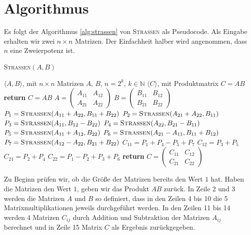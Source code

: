 \documentclass{scrartcl}
\numberwithin{equation}{section}
\begin{document}
\section{Algorithmus}
Es folgt der Algorithmus \ref{alg:strassen} von \textsc{Strassen}  als Pseudocode. Als Eingabe erhalten wir zwei $n \times n$ Matrizen. Der Einfachheit halber wird angenommen, dass $n$ eine Zweierpotenz ist.
\begin{algorithm}
	\caption{\textsc{Strassen}$(A, B)$}
	\label{alg:strassen}
	\begin{algorithmic}[1]
		\Require $\langle A, B \rangle$, mit $n \times n$ Matrizen $A$, $B$, $n = 2^k$, $k \in \mathbb{N}$
		\Ensure $\langle C \rangle$, mit Produktmatrix $C = AB$
		 \textbf{return} $C = AB$
		\EndIf
		\State $A = \begin{pmatrix} A_{11} & A_{12} \\ A_{21} & A_{22} \end{pmatrix}$
		\State $B = \begin{pmatrix} B_{11} & B_{12} \\ B_{21} & B_{22} \end{pmatrix}$
		\State $P_1 = \textsc{Strassen}(A_{11} + A_{22}, B_{11} + B_{22})$
		\State $P_2 = \textsc{Strassen}(A_{21} + A_{22}, B_{11})$
		\State $P_3 = \textsc{Strassen}(A_{11}, B_{12} - B_{22})$
		\State $P_4 = \textsc{Strassen}(A_{22}, B_{21} - B_{11})$
		\State $P_5 = \textsc{Strassen}(A_{11} + A_{12}, B_{22})$
		\State $P_6 = \textsc{Strassen}(A_{21} - A_{11}, B_{11} + B_{12})$
		\State $P_7 = \textsc{Strassen}(A_{12} - A_{22}, B_{21} + B_{22})$
		\State $C_{11} = P_1 + P_4 - P_5 + P_7$
		\State $C_{12} = P_3 + P_5$
		\State $C_{21} = P_2 + P_4$
		\State $C_{22} = P_1 - P_2 + P_3 + P_6$
		\State \textbf{return} $C = \begin{pmatrix} C_{11} & C_{12} \\ C_{21} & C_{22} \end{pmatrix}$
	\end{algorithmic}
\end{algorithm}
Zu Beginn prüfen wir, ob die Größe der Matrizen bereits den Wert $1$ hat. Haben die Matrizen den Wert $1$, geben wir das Produkt $A B$ zurück. In Zeile 2 und 3 werden die Matrizen $A$ und $B$ so definiert, dass in den Zeilen 4 bis 10 die 5 Matrixmultiplikationen jeweils durchgeführt werden. In den Zeilen 11 bis 14 werden 4 Matrizen $C_{ij}$ durch Addition und Subtraktion der Matrizen $A_{ij}$ berechnet und in Zeile 15 Matrix $C$ als Ergebnis zurückgegeben.
\end{document}
